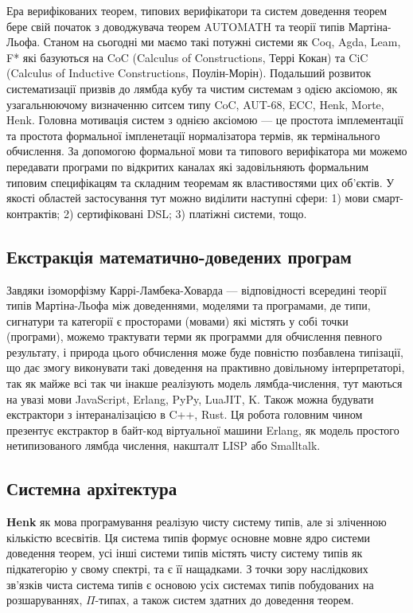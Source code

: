\documentclass{article}
\begin{document}
Ера верифікованих теорем, типових верифікатори та систем доведення теорем бере свій початок з доводжувача теорем AUTOMATH та теорії типів Мартіна-Льофа.
Станом на сьогодні ми маємо такі потужні системи як Coq, Agda, Leam, F* які базуються на CoC (Calculus of Constructions, Террі Кокан)
та CiC (Calculus of Inductive Constructions, Поулін-Морін). Подальший розвиток систематизації призвів до лямбда кубу та чистим
системам з одією аксіомою, як узагальнюючому визначенню ситсем типу CoC, AUT-68, ECC, Henk, Morte, Henk.
Головна мотивація систем з однією аксіомою — це простота імплементації та простота формальної імпленетації
нормалізатора термів, як термінального обчислення. За допомогою формальної мови та типового верифікатора ми можемо
передавати програми по відкритих каналах які задовільняють формальним типовим специфікацям та складним теоремам як властивостями цих об'єктів.
У якості областей застосування тут можно виділити наступні сфери: 1) мови смарт-контрактів; 2) сертифіковані DSL; 3) платіжні системи, тощо.

\subsection{Екстракція математично-доведених програм}
Завдяки ізоморфізму Каррі-Ламбека-Ховарда — відповідності всередині теорії типів Мартіна-Льофа\cite{Lof84} між доведеннями, моделями та програмами,
де типи, сигнатури та категорії є просторами (мовами) які містять у собі точки (програми), можемо трактувати терми як программи для обчислення певного результату,
і природа цього обчислення може буде повністю позбавлена типізації, що дає змогу виконувати такі доведення на практивно довільному інтерпретаторі,
так як майже всі так чи інакше реалізують модель лямбда-числення, тут маються на увазі мови JavaScript, Erlang, PyPy, LuaJIT, K. Також можна будувати
екстрактори з інтераналізацією в C++, Rust. Ця робота головним чином презентує екстрактор в байт-код віртуальної машини Erlang, як модель
простого нетипизованого лямбда числення, накшталт LISP або Smalltalk.

\subsection{Системна архітектура}
\textbf{Henk} як мова програмування реалізую чисту систему типів, але зі зліченною кількістю всесвітів.
Ця система типів формує основне мовне ядро системи доведення теорем, усі інші системи типів  містять чисту систему типів
як підкатегорію у свому спектрі, та є її нащадками. З точки зору наслідкових зв'язків чиста система типів є
основою усіх системах типів побудованих на розшаруваннях, $\Pi$-типах, а також систем здатних до доведення теорем.
\end{document}
